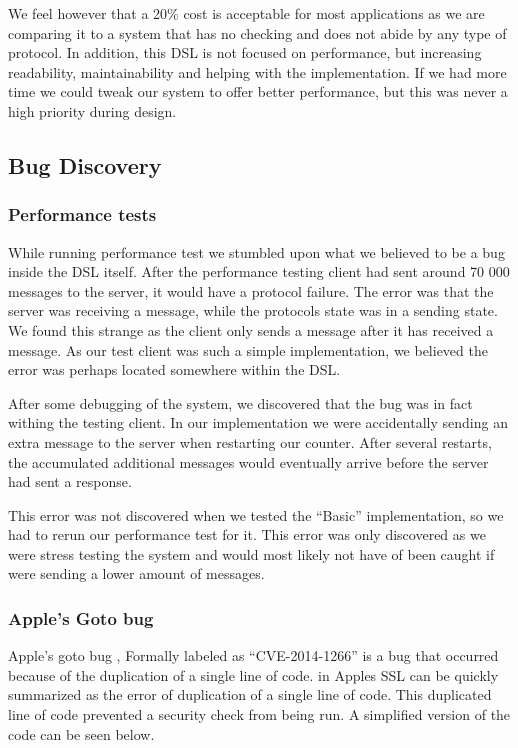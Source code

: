 We feel however that a 20\% cost is acceptable for most applications as we are comparing it to a system that has no checking and does not abide by any type of protocol. In addition, this DSL is not focused on performance, but increasing readability, maintainability and helping with the implementation. If we had more time we could tweak our system to offer better performance, but this was never a high priority during design. 


\subsection{Bug Discovery}
\subsubsection{Performance tests}
While running performance test we stumbled upon what we believed to be a bug inside the DSL itself. After the performance testing client had sent around 70 000 messages to the server, it would have a protocol failure. The error was that the server was receiving a message, while the protocols state was in a sending state. We found this strange as the client only sends a message after it has received a message. As our test client was such a simple implementation, we believed the error was perhaps located somewhere within the DSL.
 
After some debugging of the system, we discovered that the bug was in fact withing the testing client. In our implementation we were accidentally sending an extra message to the server when restarting our counter. After several restarts, the accumulated additional messages would eventually arrive before the server had sent a response.

This error was not discovered when we tested the ``Basic'' implementation, so we had to rerun our performance test for it. This error was only discovered as we were stress testing the system and would most likely not have of been caught if were sending a lower amount of messages.

\subsubsection{Apple's Goto bug}
Apple's goto bug , Formally labeled as ``CVE-2014-1266'' \cite{bland2014finding} is a bug that occurred because of the duplication of a single line of code.  in Apples SSL can be quickly summarized as the error of duplication of a single line of code. This duplicated line of code prevented a security check from being run. A simplified version of the code can be seen below.

